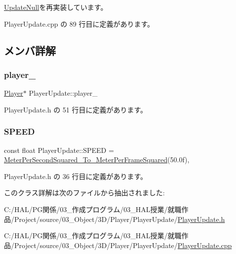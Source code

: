 \mbox{\hyperlink{class_update_null_a692f4f34e4ef35ca286a1d3606fdf473}{Update\+Null}}を再実装しています。



 Player\+Update.\+cpp の 89 行目に定義があります。



\subsection{メンバ詳解}
\mbox{\label{class_player_update_abd75bd3c4e3ecc2863e272a5e14b677f}} 
\subsubsection{\texorpdfstring{player\+\_\+}{player\_}}
{\footnotesize\ttfamily \mbox{\hyperlink{class_player}{Player}}$\ast$ Player\+Update\+::player\+\_\+\hspace{0.3cm}{\ttfamily [private]}}



 Player\+Update.\+h の 51 行目に定義があります。

\mbox{\label{class_player_update_ade4f68ed032e187334cc2e3922e365c5}} 
\subsubsection{\texorpdfstring{S\+P\+E\+ED}{SPEED}}
{\footnotesize\ttfamily const float Player\+Update\+::\+S\+P\+E\+ED = \mbox{\hyperlink{_meter_to_frame_8h_a3a2c155748ceb2eab2a3c303ae48ecc0}{Meter\+Per\+Second\+Squared\+\_\+\+To\+\_\+\+Meter\+Per\+Frame\+Squared}}(50.\+0f)\hspace{0.3cm}{\ttfamily [static]}, {\ttfamily [private]}}



 Player\+Update.\+h の 36 行目に定義があります。



このクラス詳解は次のファイルから抽出されました\+:\begin{DoxyCompactItemize}
\item 
C\+:/\+H\+A\+L/\+P\+G関係/03\+\_\+作成プログラム/03\+\_\+\+H\+A\+L授業/就職作品/\+Project/source/03\+\_\+\+Object/3\+D/\+Player/\+Player\+Update/\mbox{\hyperlink{_player_update_8h}{Player\+Update.\+h}}\item 
C\+:/\+H\+A\+L/\+P\+G関係/03\+\_\+作成プログラム/03\+\_\+\+H\+A\+L授業/就職作品/\+Project/source/03\+\_\+\+Object/3\+D/\+Player/\+Player\+Update/\mbox{\hyperlink{_player_update_8cpp}{Player\+Update.\+cpp}}\end{DoxyCompactItemize}
